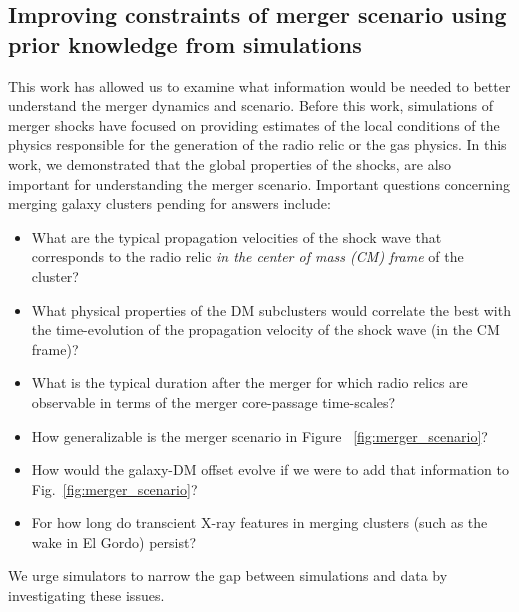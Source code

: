 \documentclass[letterpaper,useAMS,usenatbib]{mn2e}
\begin{document}
\subsection{Improving constraints of merger scenario using prior knowledge from simulations}
This work has allowed us to examine
what information would be needed to better understand the merger
dynamics and scenario. Before this work, simulations of merger shocks have
focused on providing estimates of the local conditions of the physics
responsible for the generation of the radio relic or the gas physics. In this work, we demonstrated that the global
properties of the shocks, are also important for understanding the merger scenario. 
Important questions concerning merging galaxy
clusters pending for answers include:  
\begin{itemize}
\item What are the typical propagation velocities of the shock wave that
	corresponds to the radio relic {\it in the center of mass (CM) frame} of the cluster?
\item What physical properties of the DM subclusters would correlate the
	best with the time-evolution of the propagation velocity of the shock
	wave (in the CM frame)?  
\item What is the typical duration
after the merger for which radio relics are observable in terms of the merger
core-passage time-scales? 
\item How generalizable is the merger scenario in Figure
~\ref{fig:merger_scenario}?  
\item How would the galaxy-DM offset evolve if we were to add that information
	to Fig.~\ref{fig:merger_scenario}?
\item For how long do transcient X-ray features in merging clusters (such
		as the wake in El Gordo) persist?
\end{itemize}
We urge simulators to narrow the gap between simulations and data by
investigating these issues.
\end{document}
